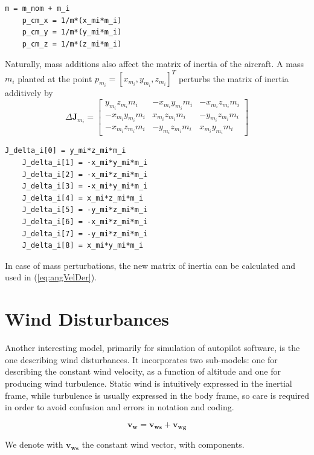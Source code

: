 \begin{lstlisting}[style=C-style]
	m = m_nom + m_i
	p_cm_x = 1/m*(x_mi*m_i)
	p_cm_y = 1/m*(y_mi*m_i)
	p_cm_z = 1/m*(z_mi*m_i)
\end{lstlisting}

Naturally, mass additions also affect the matrix of inertia of the aircraft. A mass $m_{i}$ planted at the point $p_{m_i} = [x_{m_i}, y_{m_i}, z_{m_i}]^T$ perturbs the matrix of inertia additively by
\begin{equation}
	\Delta \bm{J}_{m_i} =
	\begin{bmatrix}
		y_{m_i} z_{m_i} m_{i}  & -x_{m_i} y_{m_i} m_i & -x_{m_i}z_{m_i}m_i   \\
		-x_{m_i} y_{m_i} m_i & x_{m_i} z_{m_i} m_i  & -y_{m_i} z_{m_i} m_i \\
		-x_{m_i}z_{m_i}m_i   & -y_{m_i} z_{m_i} m_i & x_{m_i} y_{m_i} m_i
	\end{bmatrix}
\end{equation}

\begin{lstlisting}[style=C-style]
	J_delta_i[0] = y_mi*z_mi*m_i
	J_delta_i[1] = -x_mi*y_mi*m_i
	J_delta_i[2] = -x_mi*z_mi*m_i
	J_delta_i[3] = -x_mi*y_mi*m_i
	J_delta_i[4] = x_mi*z_mi*m_i
	J_delta_i[5] = -y_mi*z_mi*m_i
	J_delta_i[6] = -x_mi*z_mi*m_i
	J_delta_i[7] = -y_mi*z_mi*m_i
	J_delta_i[8] = x_mi*y_mi*m_i
\end{lstlisting}

In case of mass perturbations, the new matrix of inertia can be calculated and used in (\ref{eq:angVelDer}).

\section{Wind Disturbances}
Another interesting model, primarily for simulation of autopilot software, is the one describing wind disturbances. It incorporates two sub-models: one for describing the constant wind velocity, as a function of altitude and one for producing wind turbulence. Static wind is intuitively expressed in the inertial frame, while turbulence is usually expressed in the body frame, so care is required in order to avoid confusion and errors in notation and coding.

\begin{equation}
	\bm{v_w} = \bm{v_{ws}} + \bm{v_{wg}}
\end{equation}

We denote with $\bm{v_{ws}}$ the constant wind vector, with components.

